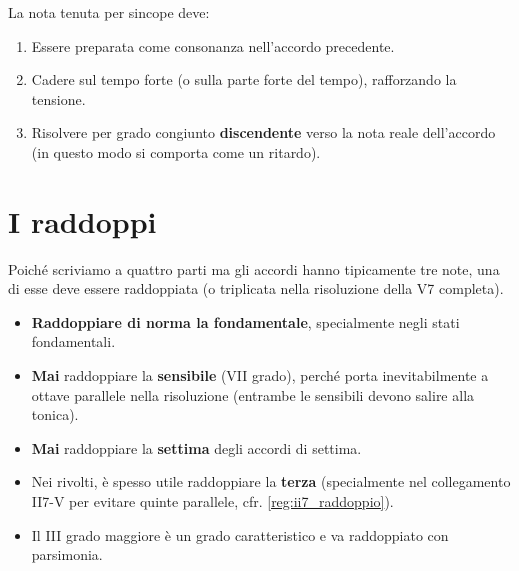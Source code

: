 \begin{regola}
	\label{reg:sincope_armonica}
	La nota tenuta per sincope deve:
	\begin{enumerate}
		\item Essere preparata come consonanza nell'accordo precedente.
		\item Cadere sul tempo forte (o sulla parte forte del tempo), rafforzando la tensione.
		\item Risolvere per grado congiunto \textbf{discendente} verso la nota reale dell'accordo (in questo modo si comporta come un ritardo).
	\end{enumerate}
\end{regola}

\section{I raddoppi}
\label{sec:raddoppi}

Poiché scriviamo a quattro parti ma gli accordi hanno tipicamente tre note, una di esse deve essere raddoppiata (o triplicata nella risoluzione della V7 completa).

\begin{regola}
	\label{reg:raddoppi}
	\begin{itemize}
		\item \textbf{Raddoppiare di norma la fondamentale}, specialmente negli stati fondamentali.
		\item \textbf{Mai} raddoppiare la \textbf{sensibile} (VII grado), perché porta inevitabilmente a ottave parallele nella risoluzione (entrambe le sensibili devono salire alla tonica).
		\item \textbf{Mai} raddoppiare la \textbf{settima} degli accordi di settima.
		\item Nei rivolti, è spesso utile raddoppiare la \textbf{terza} (specialmente nel collegamento II7-V per evitare quinte parallele, cfr. \ref{reg:ii7_raddoppio}).
		\item Il III grado maggiore è un grado caratteristico e va raddoppiato con parsimonia.
	\end{itemize}
\end{regola}

